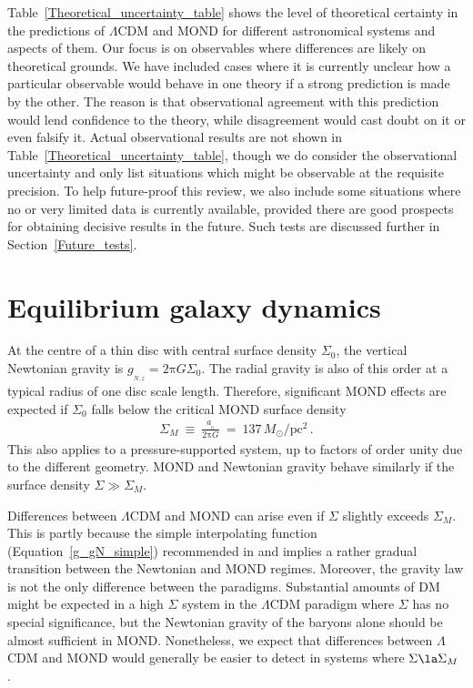 \documentclass[fleqn,usenatbib,useAMS,onecolumn]{mnras} %
\begin{document}
Table~\ref{Theoretical_uncertainty_table} shows the level of theoretical certainty in the predictions of $\Lambda$CDM and MOND for different astronomical systems and aspects of them. Our focus is on observables where differences are likely on theoretical grounds. We have included cases where it is currently unclear how a particular observable would behave in one theory if a strong prediction is made by the other. The reason is that observational agreement with this prediction would lend confidence to the theory, while disagreement would cast doubt on it or even falsify it. Actual observational results are not shown in Table~\ref{Theoretical_uncertainty_table}, though we do consider the observational uncertainty and only list situations which might be observable at the requisite precision. To help future-proof this review, we also include some situations where no or very limited data is currently available, provided there are good prospects for obtaining decisive results in the future. Such tests are discussed further in Section~\ref{Future_tests}.





\section{Equilibrium galaxy dynamics}
\label{Equilibrium_galaxy_dynamics}

At the centre of a thin disc with central surface density $\Sigma_0$, the vertical Newtonian gravity is $g_{_{N,z}} = 2 \mathrm{\pi}G\Sigma_0$. The radial gravity is also of this order at a typical radius of one disc scale length. Therefore, significant MOND effects are expected if $\Sigma_0$ falls below the critical MOND surface density
\begin{eqnarray}
	\Sigma_M ~\equiv~ \frac{a_{_0}}{2 \mathrm{\pi} G} ~=~ 137 \, M_\odot/\text{pc}^2 \, .
	\label{Sigma_M}
\end{eqnarray}
This also applies to a pressure-supported system, up to factors of order unity due to the different geometry. MOND and Newtonian gravity behave similarly if the surface density $\Sigma \gg \Sigma_M$.

Differences between $\Lambda$CDM and MOND can arise even if $\Sigma$ slightly exceeds $\Sigma_M$. This is partly because the simple interpolating function (Equation~\ref{g_gN_simple}) recommended in \citet{Iocco_Bertone_2015} and \citet{Banik_2018_Centauri} implies a rather gradual transition between the Newtonian and MOND regimes. Moreover, the gravity law is not the only difference between the paradigms. Substantial amounts of DM might be expected in a high $\Sigma$ system in the $\Lambda$CDM paradigm where $\Sigma$ has no special significance, but the Newtonian gravity of the baryons alone should be almost sufficient in MOND. Nonetheless, we expect that differences between $\Lambda$CDM and MOND would generally be easier to detect in systems where $\Sigma \la \Sigma_M$ \citep{Milgrom_1983}.
\end{document}
